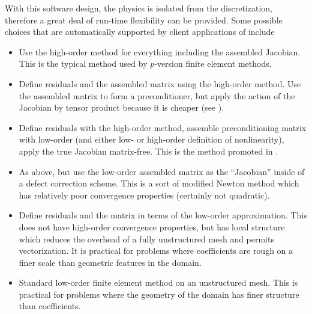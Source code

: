 With this software design, the physics is isolated from the discretization, therefore a great deal of run-time flexibility can be provided.
Some possible choices that are automatically supported by client applications of {\Dohp} include
\begin{itemize}
\item Use the high-order method for everything including the assembled Jacobian.
  This is the typical method used by $p$-version finite element methods.
\item Define residuals and the assembled matrix using the high-order method.
  Use the assembled matrix to form a preconditioner, but apply the action of the Jacobian by tensor product because it is cheaper (see ).
\item Define residuals with the high-order method, assemble preconditioning matrix with low-order (and either low- or high-order definition of nonlinearity), apply the true Jacobian matrix-free.
  This is the method promoted in .
\item As above, but use the low-order assembled matrix as the ``Jacobian'' inside of a defect correction scheme.
  This is a sort of modified Newton method which has relatively poor convergence properties (certainly not quadratic).
\item Define residuals and the matrix in terms of the low-order approximation.
  This does not have high-order convergence properties, but has local structure which reduces the overhead of a fully unstructured mesh and permits vectorization.
  It is practical for problems where coefficients are rough on a finer scale than geometric features in the domain.
\item Standard low-order finite element method on an unstructured mesh.
  This is practical for problems where the geometry of the domain has finer structure than coefficients.
\end{itemize}

